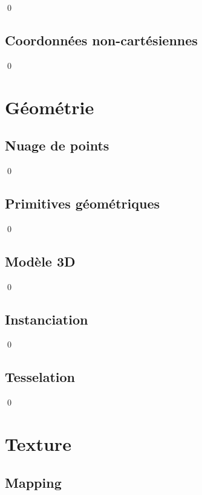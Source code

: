 \documentclass[12pt]{article}
\newcommand{\state}{\noindent}
\begin{document}
\qed

\subsection{Coordonnées non-cartésiennes}

\state

\qed


\pagebreak

\section{Géométrie}

\subsection{Nuage de points}

\state

\qed

\subsection{Primitives géométriques}

\state

\qed

\subsection{Modèle 3D}

\state

\qed

\subsection{Instanciation}

\state

\qed

\subsection{Tesselation}

\state

\qed

\pagebreak

\section{Texture}

\subsection{Mapping}
\end{document}
